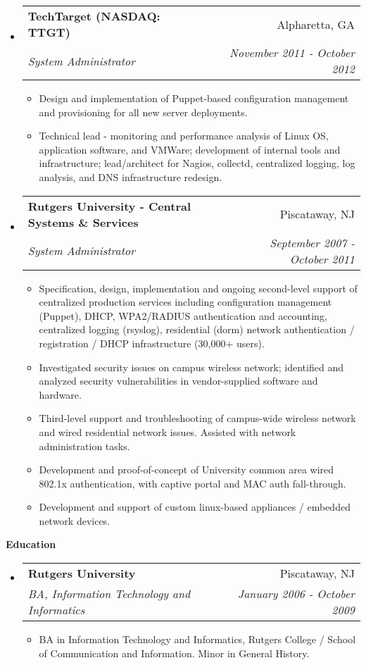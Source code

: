 \documentclass[letterpaper,11pt]{article}
\makeatletter
\newcommand{\resitem}[1]{\item #1 \vspace{-2pt}}
\newcommand{\resheading}[1]{{\large \colorbox{mygrey}{\begin{minipage}{\textwidth}{\textbf{#1 \vphantom{p\^{E}}}}\end{minipage}}}}
\newcommand{\ressubheading}[4]{
\begin{tabular*}{7.0in}{l@{\extracolsep{\fill}}r}
		\textbf{#1} & #2 \\
		\textit{#3} & \textit{#4} \\
\end{tabular*}\vspace{-6pt}}
\makeatother
\begin{document}
\begin{itemize}
\item
	\ressubheading{TechTarget  (NASDAQ: TTGT)}{Alpharetta, GA}{System Administrator}{November 2011 - October 2012}
	\begin{itemize}
		            \resitem{Design and implementation of Puppet-based configuration management and provisioning for all new server deployments.}
                \resitem{Technical lead - monitoring and performance analysis of Linux OS, application software, and VMWare; development of internal tools and infrastructure; lead/architect for Nagios, collectd, centralized logging, log analysis, and DNS infrastructure redesign.}
	\end{itemize}
\item
	\ressubheading{Rutgers University - Central Systems \& Services}{Piscataway, NJ}{System Administrator}{September 2007 - October 2011}
	\begin{itemize}
                \resitem{Specification, design, implementation and ongoing second-level support of centralized production services including configuration management (Puppet), DHCP, WPA2/RADIUS authentication and accounting, centralized logging (rsyslog), residential (dorm) network authentication / registration / DHCP infrastructure (30,000+ users).}
                \resitem{Investigated security issues on campus wireless network; identified and analyzed security vulnerabilities in vendor-supplied software and hardware.}
                \resitem{Third-level support and troubleshooting of campus-wide wireless network and wired residential network issues. Assisted with network administration tasks.}
		            \resitem{Development and proof-of-concept of University common area wired 802.1x authentication, with captive portal and MAC auth fall-through.}
		            \resitem{Development and support of custom linux-based appliances / embedded network devices.}
	\end{itemize}

\end{itemize}

\resheading{Education}
\begin{itemize}
\item
	\ressubheading{Rutgers University}{Piscataway, NJ}{BA, Information Technology and Informatics}{January 2006 - October 2009}
	\begin{itemize}
		\resitem{BA in Information Technology and Informatics, Rutgers
                College / School of Communication and Information. Minor in
                General History.}
	\end{itemize}
\end{itemize}
\end{document}
